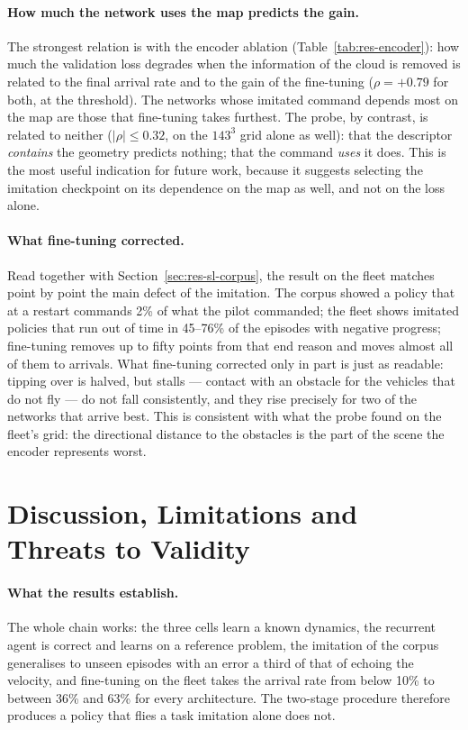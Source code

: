 \paragraph{How much the network uses the map predicts the gain.}
The strongest relation is with the encoder ablation (Table~\ref{tab:res-encoder}):
how much the validation loss degrades when the information of the cloud is
removed is related to the final arrival rate and to the gain of the fine-tuning
($\rho = +0.79$ for both, at the threshold). The networks whose imitated command
depends most on the map are those that fine-tuning takes furthest. The probe,
by contrast, is related to neither ($|\rho| \le 0.32$, on the $143^3$ grid
alone as well): that the descriptor \emph{contains} the geometry predicts
nothing; that the command \emph{uses} it does. This is the most useful
indication for future work, because it suggests selecting the imitation
checkpoint on its dependence on the map as well, and not on the loss alone.

\paragraph{What fine-tuning corrected.}
Read together with Section~\ref{sec:res-sl-corpus}, the result on the fleet
matches point by point the main defect of the imitation. The corpus showed a
policy that at a restart commands 2\% of what the pilot commanded; the fleet
shows imitated policies that run out of time in 45--76\% of the episodes with
negative progress; fine-tuning removes up to fifty points from that end reason
and moves almost all of them to arrivals. What fine-tuning corrected only in
part is just as readable: tipping over is halved, but stalls --- contact with
an obstacle for the vehicles that do not fly --- do not fall consistently, and
they rise precisely for two of the networks that arrive best. This is
consistent with what the probe found on the fleet's grid: the directional
distance to the obstacles is the part of the scene the encoder represents
worst.


\section{Discussion, Limitations and Threats to Validity}
\label{sec:res-discussion}

\paragraph{What the results establish.}
The whole chain works: the three cells learn a known dynamics, the recurrent
agent is correct and learns on a reference problem, the imitation of the corpus
generalises to unseen episodes with an error a third of that of echoing the
velocity, and fine-tuning on the fleet takes the arrival rate from below 10\% to
between 36\% and 63\% for every architecture. The two-stage procedure therefore
produces a policy that flies a task imitation alone does not.

